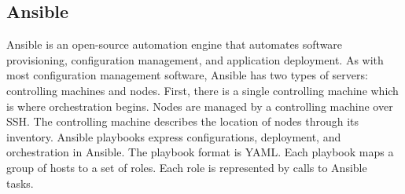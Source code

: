 \subsection*{Ansible} \label{lang:ansible}
Ansible is an open-source automation engine that automates software provisioning, configuration management, and application deployment.
As with most configuration management software, Ansible has two types of servers: controlling machines and nodes.
First, there is a single controlling machine which is where orchestration begins.
Nodes are managed by a controlling machine over SSH.
The controlling machine describes the location of nodes through its inventory.
Ansible playbooks express configurations, deployment, and orchestration in Ansible.
The playbook format is YAML. 
Each playbook maps a group of hosts to a set of roles.
Each role is represented by calls to Ansible tasks.~\cite{ansible} 
